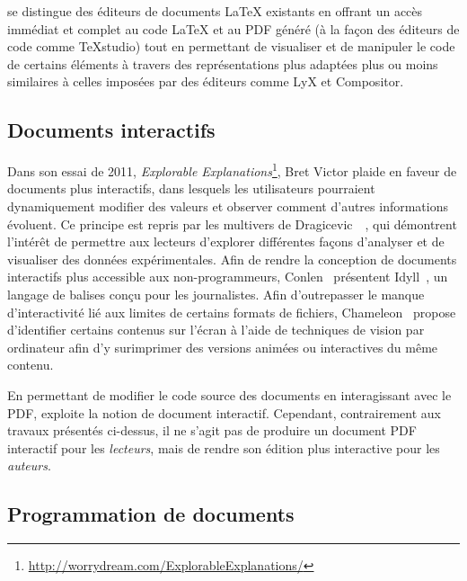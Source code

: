\iLaTeX{} se distingue des éditeurs de documents \LaTeX{} existants en offrant un accès immédiat et complet au code \LaTeX{} et au PDF généré (à la façon des éditeurs de code comme TeXstudio) tout en permettant de visualiser et de manipuler le code de certains éléments à travers des représentations plus adaptées plus ou moins similaires à celles imposées par des éditeurs comme LyX et Compositor.



\subsection{Documents interactifs}

Dans son essai de 2011, \emph{Explorable Explanations}\footnote{\url{http://worrydream.com/ExplorableExplanations/}}, Bret Victor plaide en faveur de documents plus interactifs, dans lesquels les utilisateurs pourraient dynamiquement modifier des valeurs et observer comment d'autres informations évoluent.
Ce principe est repris par les multivers de Dragicevic~\etal{}~\cite{dragicevic2019increasing}, qui démontrent l'intérêt de permettre aux lecteurs d'explorer différentes façons d'analyser et de visualiser des données expérimentales.
Afin de rendre la conception de documents interactifs plus accessible aux non-programmeurs, Conlen~\etal{} présentent Idyll~\cite{conlen2018idyll}, un langage de balises conçu pour les journalistes.
Afin d'outrepasser le manque d'interactivité lié aux limites de certains formats de fichiers, Chameleon~\cite{masson2020chameleon} propose d'identifier certains contenus sur l'écran à l'aide de techniques de vision par ordinateur afin d'y surimprimer des versions animées ou interactives du même contenu.

En permettant de modifier le code source des documents en interagissant avec le PDF, \iLaTeX{} exploite la notion de document interactif.
Cependant, contrairement aux travaux présentés ci-dessus, il ne s'agit pas de produire un document PDF interactif pour les \emph{lecteurs}, mais de rendre son édition plus interactive pour les \emph{auteurs}.



\subsection{Programmation de documents}

